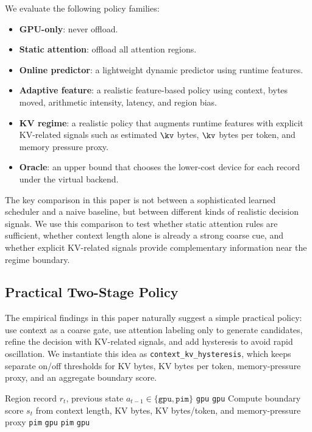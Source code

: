 We evaluate the following policy families:
\begin{itemize}
\item \textbf{GPU-only}: never offload.
\item \textbf{Static attention}: offload all attention regions.
\item \textbf{Online predictor}: a lightweight dynamic predictor using runtime features.
\item \textbf{Adaptive feature}: a realistic feature-based policy using context, bytes moved, arithmetic intensity, latency, and region bias.
\item \textbf{KV regime}: a realistic policy that augments runtime features with explicit KV-related signals such as estimated $\kv$ bytes, $\kv$ bytes per token, and memory pressure proxy.
\item \textbf{Oracle}: an upper bound that chooses the lower-cost device for each record under the virtual backend.
\end{itemize}

The key comparison in this paper is not between a sophisticated learned scheduler and a naive baseline, but between different kinds of realistic decision signals. We use this comparison to test whether static attention rules are sufficient, whether context length alone is already a strong coarse cue, and whether explicit KV-related signals provide complementary information near the regime boundary.

\subsection{Practical Two-Stage Policy}

The empirical findings in this paper naturally suggest a simple practical policy: use context as a coarse gate, use attention labeling only to generate candidates, refine the decision with KV-related signals, and add hysteresis to avoid rapid oscillation. We instantiate this idea as \texttt{context\_kv\_hysteresis}, which keeps separate on/off thresholds for KV bytes, KV bytes per token, memory-pressure proxy, and an aggregate boundary score.

\begin{algorithm}[t]
\caption{Context-Gated KV-Refined Hysteresis Policy}
\label{alg:context-kv-hysteresis}
\begin{algorithmic}[1]
\REQUIRE Region record $r_t$, previous state $a_{t-1}\in\{\texttt{gpu},\texttt{pim}\}$
    \RETURN \texttt{gpu}
\ENDIF
{}
    \RETURN \texttt{gpu}
\ENDIF
\STATE Compute boundary score $s_t$ from context length, KV bytes, KV bytes/token, and memory-pressure proxy
        \RETURN \texttt{pim}
    \ELSE
        \RETURN \texttt{gpu}
    \ENDIF
\ELSE
        \RETURN \texttt{pim}
    \ELSE
        \RETURN \texttt{gpu}
    \ENDIF
\ENDIF
\end{algorithmic}
\end{algorithm}

